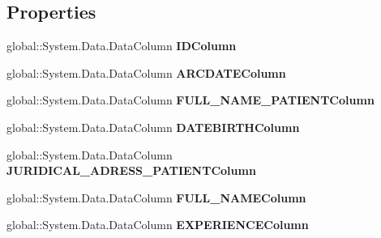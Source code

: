 \subsection*{Properties}
\begin{CompactItemize}
\item 
global::System.Data.DataColumn \textbf{IDColumn}\hspace{0.3cm}{\tt  [get]}\label{class_automatic_medical_system_1_1_data_set1_1_1_v_a_r_c_s_p_d_o_c_t_o_r_r_e_c_o_r_d_s_data_table_fc8f434d944c5938f3178d3af2a53ff2}

\item 
global::System.Data.DataColumn \textbf{ARCDATEColumn}\hspace{0.3cm}{\tt  [get]}\label{class_automatic_medical_system_1_1_data_set1_1_1_v_a_r_c_s_p_d_o_c_t_o_r_r_e_c_o_r_d_s_data_table_8184e75bf41deed657019aafb1b0bc6c}

\item 
global::System.Data.DataColumn \textbf{FULL\_\-NAME\_\-PATIENTColumn}\hspace{0.3cm}{\tt  [get]}\label{class_automatic_medical_system_1_1_data_set1_1_1_v_a_r_c_s_p_d_o_c_t_o_r_r_e_c_o_r_d_s_data_table_9c39196603cba5962def2c5a60d21d19}

\item 
global::System.Data.DataColumn \textbf{DATEBIRTHColumn}\hspace{0.3cm}{\tt  [get]}\label{class_automatic_medical_system_1_1_data_set1_1_1_v_a_r_c_s_p_d_o_c_t_o_r_r_e_c_o_r_d_s_data_table_137b951fd949f65098bdec40fa7397e8}

\item 
global::System.Data.DataColumn \textbf{JURIDICAL\_\-ADRESS\_\-PATIENTColumn}\hspace{0.3cm}{\tt  [get]}\label{class_automatic_medical_system_1_1_data_set1_1_1_v_a_r_c_s_p_d_o_c_t_o_r_r_e_c_o_r_d_s_data_table_98c0e81f19ac089dcccd3ae4e78a8527}

\item 
global::System.Data.DataColumn \textbf{FULL\_\-NAMEColumn}\hspace{0.3cm}{\tt  [get]}\label{class_automatic_medical_system_1_1_data_set1_1_1_v_a_r_c_s_p_d_o_c_t_o_r_r_e_c_o_r_d_s_data_table_14ef11e050e4415f76e73a641bc3c64e}

\item 
global::System.Data.DataColumn \textbf{EXPERIENCEColumn}\hspace{0.3cm}{\tt  [get]}\label{class_automatic_medical_system_1_1_data_set1_1_1_v_a_r_c_s_p_d_o_c_t_o_r_r_e_c_o_r_d_s_data_table_816dce778540d0ec00ee515488dea27b}


\end{CompactItemize}
